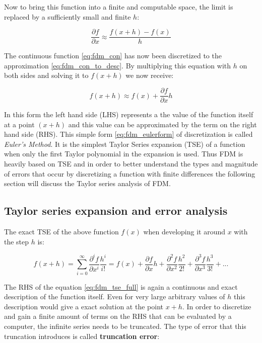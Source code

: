 Now to bring this function into a finite and computable space, the limit is replaced by a sufficiently small and finite $h$:

\begin{equation} \label{eq:fdm_con_to_desc}
\frac {\partial f}{\partial x}  \approx
\frac {f(x+h)-f(x)}{h} 
\end{equation}

The continuous function \ref{eq:fdm_con} has now been discretized to the approximation
\ref{eq:fdm_con_to_desc}.  By multiplying this equation with $h$ on both sides and solving it to $f(x+h)$ we now receive:

\begin{equation} \label{eq:fdm_eulerform}
f(x+h) \approx
f(x) + \frac {\partial f}{\partial x} h
\end{equation}

In this form the left hand side (LHS) represents a the value of the function itself
at a point $(x+h)$ and this value can be approximated by the term on the right hand side (RHS). This  simple form \ref{eq:fdm_eulerform}
of discretization is called \emph{Euler's Method}. It is the simplest Taylor Series expansion (TSE) of a function when only the first
Taylor polynomial in the expansion is used. Thus FDM is heavily based on TSE and in order to better understand the types and magnitude of errors that occur by discretizing
a function with finite differences the following section will discuss the Taylor series analysis of FDM.

\subsection{Taylor series expansion and error analysis}
\label{sec:taylor_ser_num_ana}

The exact TSE of the above function $ f(x) $ when developing it around $x$ with the step $h$ is:

\begin{equation} \label{eq:fdm_tse_full}
f(x+h) =
\sum_{i=0}^{\infty}\frac{\partial^i f}{\partial x^i} \frac {h^i}{i!} = 
f(x) + \frac {\partial f}{\partial x} h + \frac {\partial^2 f}{\partial x^2} \frac {h^2}{2!} + \frac {\partial^3 f}{\partial x^3} \frac {h^3}{3!} + ...
\end{equation}

The RHS of the equation \ref{eq:fdm_tse_full} is again a continuous and exact description of the function itself. Even for very large arbitrary values of $h$ this description
would give a exact solution at  the point $x+h$.  In order to discretize and gain a finite amount of terms on the RHS that can be evaluated by a computer, the infinite
series needs to be truncated. The type of error that this truncation introduces is called \textbf{truncation error}:

